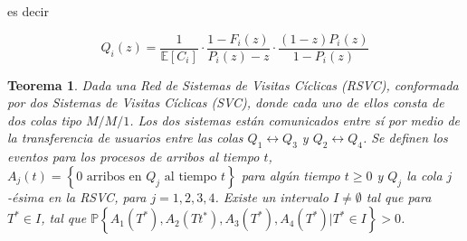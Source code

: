 \documentclass{article}
\newtheorem{Teo}{Teorema}
\newcommand{\esp}{\mathbb{E}}
\newcommand{\prob}{\mathbb{P}}
\begin{document}
es decir

\begin{equation}
Q_{i}\left(z\right)=\frac{1}{\esp\left[C_{i}\right]}\cdot\frac{1-F_{i}\left(z\right)}{P_{i}\left(z\right)-z}\cdot\frac{\left(1-z\right)P_{i}\left(z\right)}{1-P_{i}\left(z\right)}
\end{equation}

\begin{Teo}
Dada una Red de Sistemas de Visitas C\'iclicas (RSVC), conformada por dos Sistemas de Visitas C\'iclicas (SVC), donde cada uno de ellos consta de dos colas tipo $M/M/1$. Los dos sistemas est\'an comunicados entre s\'i por medio de la transferencia de usuarios entre las colas $Q_{1}\leftrightarrow Q_{3}$ y $Q_{2}\leftrightarrow Q_{4}$. Se definen los eventos para los procesos de arribos al tiempo $t$, $A_{j}\left(t\right)=\left\{0 \textrm{ arribos en }Q_{j}\textrm{ al tiempo }t\right\}$ para alg\'un tiempo $t\geq0$ y $Q_{j}$ la cola $j$-\'esima en la RSVC, para $j=1,2,3,4$.  Existe un intervalo $I\neq\emptyset$ tal que para $T^{*}\in I$, tal que $\prob\left\{A_{1}\left(T^{*}\right),A_{2}\left(Tt^{*}\right),
A_{3}\left(T^{*}\right),A_{4}\left(T^{*}\right)|T^{*}\in I\right\}>0$.
\end{Teo}
\end{document}
